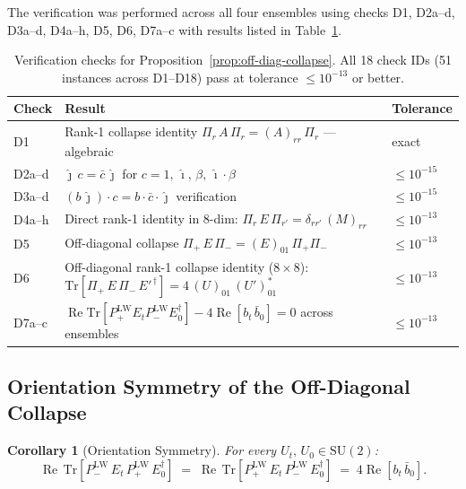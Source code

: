 \documentclass[12pt]{article}
\numberwithin{equation}{section}
\theoremstyle{plain}
\newtheorem{corollary}{Corollary}[section]
\theoremstyle{definition}
\theoremstyle{remark}
\newcommand{\su}{\mathrm{SU}}              %
\newcommand{\tr}{\mathrm{Tr}}              %
\newcommand{\ihat}{\hat{\imath}}           %
\newcommand{\jhat}{\hat{\jmath}}           %
\newcommand{\PLW}{P^{\mathrm{LW}}}         %
\newcommand{\Pip}{\Pi_{+}}                 %
\newcommand{\Pim}{\Pi_{-}}                 %
\newcommand{\Pir}{\Pi_{r}}                 %
\begin{document}
	The verification was performed across all four ensembles using checks
	D1, D2a--d, D3a--d, D4a--h, D5, D6, D7a--c with results listed in
	Table~\ref{tab:prop1-verification}.
	
	
	\begin{table}[ht]
		\centering
		\caption{Verification checks for
			Proposition~\ref{prop:off-diag-collapse}.
			All 18 check IDs (51 instances across D1--D18) pass
			at tolerance $\leq 10^{-13}$ or better.}
		\label{tab:prop1-verification}
		\small
		\setlength{\tabcolsep}{6pt}
		\begin{tabular}{@{}lp{8.7cm}l@{}}
			\toprule
			\textbf{Check} & \textbf{Result} & \textbf{Tolerance}\\
			\midrule
			D1 & Rank-1 collapse identity
			$\Pir\, A\,\Pir = (A)_{rr}\,\Pir$ --- algebraic
			& exact \\[2pt]
			D2a--d & $\jhat\,c = \bar{c}\,\jhat$ for
			$c = 1,\,\ihat,\,\beta,\,\ihat\cdot\beta$
			& $\leq 10^{-15}$ \\[2pt]
			D3a--d & $(b\,\jhat)\cdot c = b\cdot\bar{c}\cdot\jhat$
			verification
			& $\leq 10^{-15}$ \\[2pt]
			D4a--h & Direct rank-1 identity in 8-dim:
			$\Pir\, E\,\Pi_{r'} = \delta_{rr'}\,(M)_{rr}$
			& $\leq 10^{-13}$ \\[2pt]
			D5 & Off-diagonal collapse
			$\Pip\, E\,\Pim = (E)_{01}\,\Pip\Pim$
			& $\leq 10^{-13}$ \\[2pt]
			D6 & Off-diagonal rank-1 collapse identity ($8\times 8$):
			$\tr[\Pip\, E\,\Pim\, E'^{\,\dagger}]
			= 4\,(U)_{01}\,(U')_{01}^{*}$
			& $\leq 10^{-13}$ \\[2pt]
			D7a--c & $\operatorname{Re}\tr[\PLW_+ E_t \PLW_- E_0^{\dagger}]
			- 4\operatorname{Re}[b_t\,\bar{b}_0] = 0$ across ensembles
			& $\leq 10^{-13}$ \\
			\bottomrule
		\end{tabular}
	\end{table}
	
	\subsection{Orientation Symmetry of the Off-Diagonal Collapse}
	\label{sec:orientation-sym}
	
	\begin{corollary}[Orientation Symmetry]
		\label{cor:orientation-sym}
		For every $U_t,\,U_0\in\su(2)$:
		\begin{equation}
			\operatorname{Re}\,\tr\!\left[\PLW_-\, E_t\,\PLW_+\,
			E_0^{\dagger}\right]
			\;=\; \operatorname{Re}\,\tr\!\left[\PLW_+\, E_t\,\PLW_-\,
			E_0^{\dagger}\right]
			\;=\; 4\operatorname{Re}[b_t\,\bar{b}_0].
			\label{eq:orientation-sym}
		\end{equation}
	\end{corollary}
	
\end{document}
